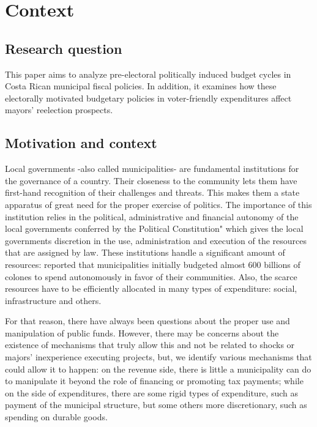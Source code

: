 \section{Context}


\subsection{Research question}

This paper aims to analyze pre-electoral politically induced budget cycles in Costa Rican municipal fiscal policies. In addition, it examines how these electorally motivated budgetary policies in voter-friendly expenditures affect mayors' reelection prospects. 

\subsection{Motivation and context}

Local governments -also called municipalities- are fundamental institutions for the governance of a country. Their closeness to the community lets them have first-hand recognition of their challenges and threats. This makes them a state apparatus of great need for the proper exercise of politics. The importance of this institution relies in the political, administrative and financial autonomy of the local governments conferred by the Political Constitution" which gives the local governments discretion in the use, administration and execution of the resources that are assigned by law. \parencite[Art. 4]{al1998}  These institutions handle a significant amount of resources: \textcite{cgr2020} reported that municipalities initially budgeted almost 600 billions of colones to spend autonomously in favor of their communities. Also, the scarce resources have to be efficiently allocated in many types of expenditure: social, infrastructure and others. 

For that reason, there have always been questions about the proper use and manipulation of public funds. However, there may be concerns about the existence of mechanisms that truly allow this and not be related to shocks or majors' inexperience executing projects, but, we identify various mechanisms that could allow it to happen: on the revenue side, there is little a municipality can do to manipulate it beyond the role of financing or promoting tax payments; while on the side of expenditures, there are some rigid types of expenditure, such as payment of the municipal structure, but some others more discretionary, such as spending on durable goods.

